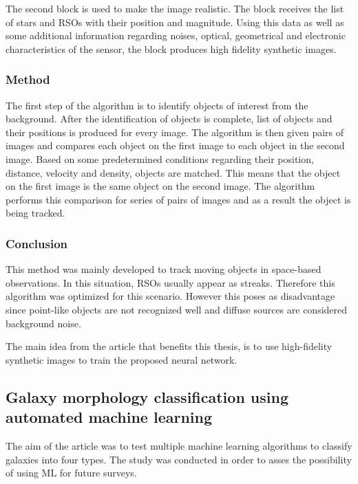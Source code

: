 The second block is used to make the image realistic. The block receives the list of stars and RSOs with their position and magnitude. Using this data as well as some additional information regarding noises, optical, geometrical and electronic characteristics of the sensor, the block produces high fidelity synthetic images. 


\subsubsection{Method}
The first step of the algorithm is to identify objects of interest from the background. After the identification of objects is complete, list of objects and their positions is produced for every image. 
The algorithm is then given pairs of images and compares each object on the first image to each object in the second image. Based on some predetermined conditions regarding their position, distance, velocity and density, objects are matched. This means that the object on the first image is the same object on the second image. The algorithm performs this comparison for series of pairs of images and as a result the object is being tracked.


\subsubsection{Conclusion}
This method was mainly developed to track moving objects in space-based observations. In this situation, RSOs usually appear as streaks. Therefore this algorithm was optimized for this scenario. However this poses as disadvantage since point-like objects are not recognized well and diffuse sources are considered background noise. 


The main idea from the article that benefits this thesis, is to use high-fidelity synthetic images to train the proposed neural network. 
 

\subsection{Galaxy morphology classification using automated machine learning} 


The aim of the article \cite{REZA2021100492} was to test multiple machine learning algorithms to classify galaxies into four types. The study was conducted in order to asses the possibility of using ML for future surveys. 

